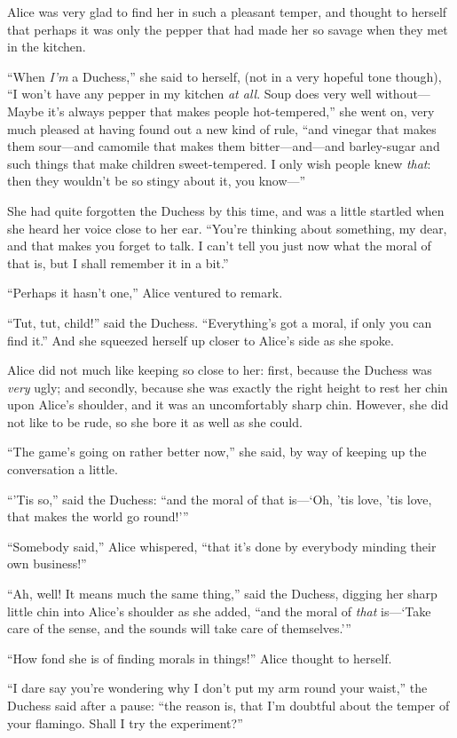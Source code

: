 \documentclass[11pt,openany,oneside]{book}
\begin{document}
Alice was very glad to find her in such a pleasant temper, and thought to herself that perhaps it was only the pepper that had made her so savage when they met in the kitchen. 

“When {\em I’m\/} a Duchess,” she said to herself, (not in a very hopeful tone though), “I won’t have any pepper in my kitchen {\em at all\/}. Soup does very well without—Maybe it’s always pepper that makes people hot-tempered,” she went on, very much pleased at having found out a new kind of rule, “and vinegar that makes them sour—and camomile that makes them bitter—and—and barley-sugar and such things that make children sweet-tempered. I only wish people knew {\em that\/}: then they wouldn’t be so stingy about it, you know—” 

She had quite forgotten the Duchess by this time, and was a little startled when she heard her voice close to her ear. “You’re thinking about something, my dear, and that makes you forget to talk. I can’t tell you just now what the moral of that is, but I shall remember it in a bit.” 

“Perhaps it hasn’t one,” Alice ventured to remark. 

“Tut, tut, child!” said the Duchess. “Everything’s got a moral, if only you can find it.” And she squeezed herself up closer to Alice’s side as she spoke. 

Alice did not much like keeping so close to her: first, because the Duchess was {\em very\/} ugly; and secondly, because she was exactly the right height to rest her chin upon Alice’s shoulder, and it was an uncomfortably sharp chin. However, she did not like to be rude, so she bore it as well as she could. 

“The game’s going on rather better now,” she said, by way of keeping up the conversation a little. 

“’Tis so,” said the Duchess: “and the moral of that is—‘Oh, ’tis love, ’tis love, that makes the world go round!’” 

“Somebody said,” Alice whispered, “that it’s done by everybody minding their own business!” 

“Ah, well! It means much the same thing,” said the Duchess, digging her sharp little chin into Alice’s shoulder as she added, “and the moral of {\em that\/} is—‘Take care of the sense, and the sounds will take care of themselves.’” 

“How fond she is of finding morals in things!” Alice thought to herself. 

“I dare say you’re wondering why I don’t put my arm round your waist,” the Duchess said after a pause: “the reason is, that I’m doubtful about the temper of your flamingo. Shall I try the experiment?” 
\end{document}
